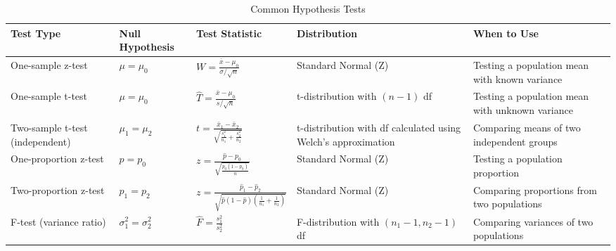 \documentclass{article}
\begin{document}
\begin{table}[H]
\centering
\begin{tabular}{|p{3cm}|p{2.5cm}|p{4cm}|p{2.5cm}|p{4cm}|}
\hline
\textbf{Test Type} & \textbf{Null Hypothesis} & \textbf{Test Statistic} & \textbf{Distribution} & \textbf{When to Use} \\
\hline
One-sample z-test & $\mu = \mu_0$ & $W = \frac{\bar{x} - \mu_0}{\sigma/\sqrt{n}}$ & Standard Normal (Z) & Testing a population mean with known variance \\
\hline
One-sample t-test & $\mu = \mu_0$ & $\hat{T} = \frac{\bar{x} - \mu_0}{s/\sqrt{n}}$ & t-distribution with $(n-1)$ df & Testing a population mean with unknown variance \\
\hline
Two-sample t-test (independent) & $\mu_1 = \mu_2$ & $t = \frac{\bar{x}_1 - \bar{x}_2}{\sqrt{\frac{s_1^2}{n_1} + \frac{s_2^2}{n_2}}}$ & t-distribution with df calculated using Welch's approximation & Comparing means of two independent groups \\
\hline
One-proportion z-test & $p = p_0$ & $z = \frac{\hat{p} - p_0}{\sqrt{\frac{p_0(1-p_0)}{n}}}$ & Standard Normal (Z) & Testing a population proportion \\
\hline
Two-proportion z-test & $p_1 = p_2$ & $z = \frac{\hat{p}_1 - \hat{p}_2}{\sqrt{\hat{p}(1-\hat{p})(\frac{1}{n_1} + \frac{1}{n_2})}}$ & Standard Normal (Z) & Comparing proportions from two populations \\
\hline
F-test (variance ratio) & $\sigma_1^2 = \sigma_2^2$ & $\hat{F} = \frac{s_1^2}{s_2^2}$ & F-distribution with $(n_1-1, n_2-1)$ df & Comparing variances of two populations \\
\hline
\end{tabular}
\caption{Common Hypothesis Tests}
\end{table}
\end{document}

